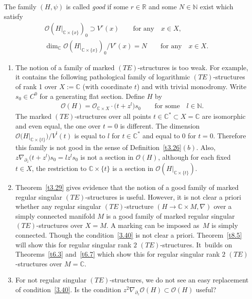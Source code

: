 \documentclass[pdftex]{sigma}%
\numberwithin{equation}{section}
\numberwithin{figure}{section}
\newcommand{\N}{{\mathbb N}}
\newcommand{\C}{{\mathbb C}}
\newcommand{\R}{{\mathbb R}}
\newcommand{\OO}{{\mathcal O}}
\newcommand{\paa}{\partial}
\newcommand{\nnn}{\nabla}
\begin{document}
\begin{Definition}
The family $(H,\psi)$ is called {\it good} if some $r\in\R$
and some $N\in\N$ exist which satisfy
\begin{gather}\label{3.39}
\OO(H|_{\C\times\{x\}})_0\supset V^{r}(x)
\qquad\text{for any}\quad x\in X,
\\
\dim_\C \OO(H|_{\C\times\{x\}})_0/V^{r}(x)=N
\qquad\text{for any}\quad x\in X.\label{3.40}
\end{gather}
\end{Definition}


\begin{Remarks}%
\qquad
\begin{enumerate}\itemsep=0pt
\item[$(i)$] The notion of a family of marked $(TE)$-structures
is too weak. For example, it contains the following
pathological family of logarithmic $(TE)$-structures
of rank 1 over $X:=\C$ (with coordinate $t$)
and with trivial monodromy. Write $s_0\in C^0$ for a
generating flat section. Define $H$ by
\begin{gather*}%
\OO(H)=\OO_{\C\times X}\cdot \big(t+z^l\big)s_0\qquad \text{for some}\quad l\in\N.
\end{gather*}
The marked $(TE)$-structures over all points $t\in\C^*\subset X=\C$
are isomorphic and even equal, the one over $t=0$ is
different. The dimension $\OO\big(H|_{\C\times\{t\}}\big)/V^l(t)$
is equal to $l$ for $t\in \C^*$ and equal to $0$ for $t=0$.
Therefore this family is not good in the sense of
Definition~\ref{t3.26}$(b)$.
Also, $z\nnn_{\paa_z}\big(t+z^l\big)s_0=lz^ls_0$ is not a
section in $\OO(H)$, although for each fixed $t\in X$,
the restriction to $\C\times\{t\}$ is a section in
$\OO(H|_{\C\times \{t\}})$.

\item[$(ii)$] Theorem~\ref{t3.29} gives evidence that the notion
of a good family of marked regular singular $(TE)$-structures
is useful. However, it is not clear a priori whether any
regular singular $(TE)$-structure $(H\to\C\times M,\nnn)$
over a simply connected manifold $M$ is a good family
of marked regular singular $(TE)$-structures over $X=M$.
A marking can be imposed as~$M$ is simply connected.
Though the condition~\eqref{3.40} is not clear a priori.
Theorem~\ref{t8.5} will show this for regular singular
rank $2$ $(TE)$-structures. It~builds on Theorems~\ref{t6.3} and~\ref{t6.7} which show this for
regular singular rank $2$ $(TE)$-structures over $M=\C$.

\item[$(iii)$] For not regular singular $(TE)$-structures,
we do not see an easy replacement of condition~\eqref{3.40}.
Is the condition $z^2\nnn_{\paa_z}\OO(H)\subset\OO(H)$
useful?
\end{enumerate}
\end{Remarks}
\end{document}
